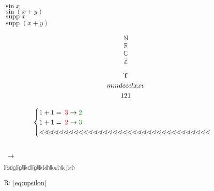\documentclass[12pt, a4paper]{article}
\newcommand\sN{{\mathbb{N}}}
\newcommand\sR{{\mathbb{R}}}
\newcommand\sC{{\mathbb{C}}}
\newcommand\sZ{{\mathbb{Z}}}
\DeclareMathOperator{\supp}{supp}
\newcommand\correction[2]{\ensuremath{\:}{\color{red}{#1}}\ensuremath{\to }{\color{correct_color}{#2}}\ensuremath{\:}}
\newcommand\green[1]{{\color{correct_color}{#1}}}
\newcommand{\RNumb}[1]{\uppercase\expandafter{\romannumeral #1\relax}}
\newcommand\textbb[1]{{$\mathbb{#1}$}}
\begin{document}
     
    
    $\sin x$\\
    $\sin(x+y)$\\
    $\supp x$\\
    $\supp(x+y)$

    \begin{gather}
        \sN \\
        \sR \\
        \sC \\
        \sZ
    \end{gather}
    
    \begin{gather}\label{eq:upsilon}
        \Upsilon \\
        \RNumb{2875} \\
        \rm 121
    \end{gather}

    

    \begin{equation}
        \begin{cases}
            1+1=\correction{3}{2} \\
            1+1=\correction{2}{3} \\
            \sphericalangle \sphericalangle \sphericalangle \sphericalangle \sphericalangle \sphericalangle \sphericalangle \sphericalangle \sphericalangle \sphericalangle \sphericalangle \sphericalangle \sphericalangle \sphericalangle \sphericalangle \sphericalangle \sphericalangle \sphericalangle \sphericalangle \sphericalangle \sphericalangle \sphericalangle \sphericalangle \sphericalangle \sphericalangle \sphericalangle \sphericalangle \sphericalangle \sphericalangle \sphericalangle \sphericalangle \sphericalangle \sphericalangle \sphericalangle \sphericalangle 
        \end{cases}            
    \end{equation}

    \green{Зелёный текст!}\\
    \correction{Неправильно}{Правильно}

    \textbb{fsdgfglkdfglkkhkuhkjkh}

    R: \ref{eq:upsilon} 
\end{document}
